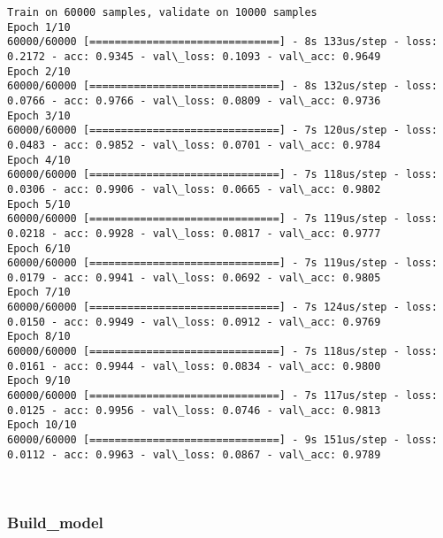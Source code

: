 \documentclass[11pt]{article}
\begin{document}
    \begin{Verbatim}[commandchars=\\\{\}]
Train on 60000 samples, validate on 10000 samples
Epoch 1/10
60000/60000 [==============================] - 8s 133us/step - loss: 0.2172 - acc: 0.9345 - val\_loss: 0.1093 - val\_acc: 0.9649
Epoch 2/10
60000/60000 [==============================] - 8s 132us/step - loss: 0.0766 - acc: 0.9766 - val\_loss: 0.0809 - val\_acc: 0.9736
Epoch 3/10
60000/60000 [==============================] - 7s 120us/step - loss: 0.0483 - acc: 0.9852 - val\_loss: 0.0701 - val\_acc: 0.9784
Epoch 4/10
60000/60000 [==============================] - 7s 118us/step - loss: 0.0306 - acc: 0.9906 - val\_loss: 0.0665 - val\_acc: 0.9802
Epoch 5/10
60000/60000 [==============================] - 7s 119us/step - loss: 0.0218 - acc: 0.9928 - val\_loss: 0.0817 - val\_acc: 0.9777
Epoch 6/10
60000/60000 [==============================] - 7s 119us/step - loss: 0.0179 - acc: 0.9941 - val\_loss: 0.0692 - val\_acc: 0.9805
Epoch 7/10
60000/60000 [==============================] - 7s 124us/step - loss: 0.0150 - acc: 0.9949 - val\_loss: 0.0912 - val\_acc: 0.9769
Epoch 8/10
60000/60000 [==============================] - 7s 118us/step - loss: 0.0161 - acc: 0.9944 - val\_loss: 0.0834 - val\_acc: 0.9800
Epoch 9/10
60000/60000 [==============================] - 7s 117us/step - loss: 0.0125 - acc: 0.9956 - val\_loss: 0.0746 - val\_acc: 0.9813
Epoch 10/10
60000/60000 [==============================] - 9s 151us/step - loss: 0.0112 - acc: 0.9963 - val\_loss: 0.0867 - val\_acc: 0.9789

    \end{Verbatim}

    \begin{center}
    \end{center}
    { \hspace*{\fill} \\}
    
    \subsubsection{Build\_model}\label{build_model}
\end{document}
